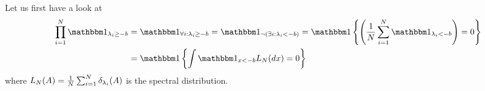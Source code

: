 Let us first have a look at
\[\begin{aligned}
	\prod_{i=1}^\dimension \ind_{\lambda_i\ge - b}
	&= \ind_{\forall i : \lambda_i \ge -b}
	= \ind_{\neg(\exists i : \lambda_i < -b)}
	= \ind\left\{
		\left(\frac1\dimension\sum_{i=1}^\dimension\ind_{\lambda_i < -b} \right) = 0
	\right\}\\
	&= \ind\left\{
		\int \ind_{x < -b} L_\dimension(dx) = 0
	\right\}
\end{aligned}\]
where \(L_N(A) = \frac1{N}\sum_{i=1}^N
\delta_{\lambda_i}(A)\) is the spectral distribution.
